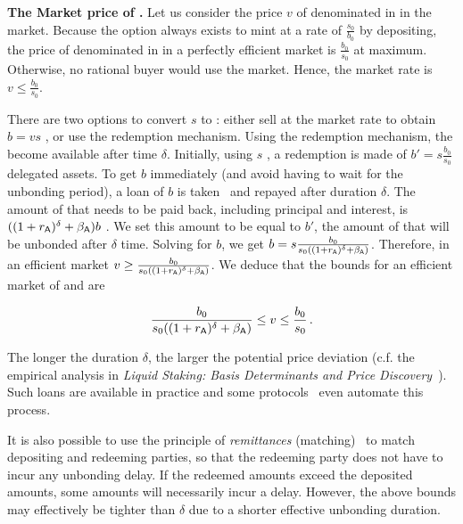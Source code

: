 \noindent
\textbf{The Market price of \stasset.}\label{sec:stasset-price}
Let us consider the price $v$ of \stasset denominated in \asset in the market.
Because the option always exists to mint at a rate of $\frac{s_0}{b_0}$ by
depositing, the price of \stasset denominated in \asset in a perfectly
efficient market is $\frac{b_0}{s_0}$ at maximum. Otherwise, no
rational buyer would use the market. Hence, the market rate is
$v \leq \frac{b_0}{s_0}$.

There are two options to convert $s$ \stasset to \asset: either sell
at the market rate to obtain $b = v s$ \asset, or use the redemption mechanism.
Using the redemption mechanism, the \assets become available after
time $\delta$.
Initially, using $s$ \stasset, a redemption is made of $b' = s \frac{b_0}{s_0}$
delegated assets. To get $b$ \asset immediately (and avoid having to wait
for the unbonding period), a loan of $b$ \asset is taken~\cite[p.~13]{liquid-staking-report} and
repayed after duration $\delta$.
The amount of \asset that needs to be paid back,
including principal and interest, is $((1 + r_{\textsf{A}})^\delta + \beta_{\textsf{A}})b$ \asset.
We set this amount to be equal to $b'$, the amount of \assets that will be
unbonded after $\delta$ time. Solving for $b$, we get
$b = s \frac{b_0}{s_0 ((1 + r_{\textsf{A}})^\delta + \beta_{\textsf{A}})}$.
Therefore, in an efficient market $v \geq \frac{b_0}{s_0 ((1 + r_{\textsf{A}})^\delta + \beta_{\textsf{A}})}$.
We deduce that the bounds for an efficient market of \asset and \stasset are

\[
  \frac{b_0}{s_0 ((1 + r_{\textsf{A}})^\delta + \beta_{\textsf{A}})} \leq v \leq \frac{b_0}{s_0}\,.
\]

The longer the duration $\delta$, the larger the potential price deviation
(c.f. the empirical analysis in
\emph{Liquid Staking: Basis Determinants and Price Discovery}~\cite{scharnowski2022liquid}).
Such loans are available in practice and some
protocols~\cite[\S5]{parallel}\cite{marinade-matching} even automate this process.

It is also possible to use the principle of \emph{remittances}
(matching)~\cite[\S5]{parallel}\cite{marinade-matching} to match depositing and
redeeming parties, so that the redeeming party does not have to incur any unbonding delay.
If the redeemed amounts exceed the deposited amounts, some amounts will necessarily incur
a delay. However, the above bounds may effectively be tighter than $\delta$ due to
a shorter effective unbonding duration.
